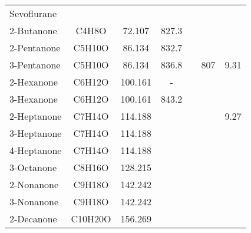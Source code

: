 \begin{landscape}
\begin{longtable}[c]{@{}lcccccc@{}}
Sevoflurane          &                  &                     &                              &                               &                          &                  \\
2-Butanone           & C4H8O            & 72.107              & 827.3                        &                               &                          &                  \\
2-Pentanone          & C5H10O           & 86.134              & 832.7                        &                               &                          &                  \\
3-Pentanone          & C5H10O           & 86.134              & 836.8                        &                               & 807                      & 9.31             \\
2-Hexanone           & C6H12O           & 100.161             & -                            &                               &                          &                  \\
3-Hexanone           & C6H12O           & 100.161             & 843.2                        &                               &                          &                  \\
2-Heptanone          & C7H14O           & 114.188             &                              &                               &                          & 9.27             \\
3-Heptanone          & C7H14O           & 114.188             &                              &                               &                          &                  \\
4-Heptanone          & C7H14O           & 114.188             &                              &                               &                          &                  \\
3-Octanone           & C8H16O           & 128.215             &                              &                               &                          &                  \\
2-Nonanone           & C9H18O           & 142.242             &                              &                               &                          &                  \\
3-Nonanone           & C9H18O           & 142.242             &                              &                               &                          &                  \\
2-Decanone           & C10H20O          & 156.269             &                              &                               &                          &                  \\

\end{longtable}
\end{landscape}
